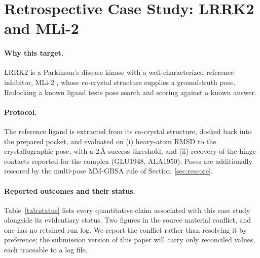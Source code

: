 \documentclass[10pt,twocolumn]{article}
\begin{document}
\section{Retrospective Case Study: LRRK2 and MLi-2}
\label{sec:case}

\paragraph{Why this target.} LRRK2 is a Parkinson's disease kinase with a
well-characterized reference inhibitor, MLi-2 \citep{fell2015mli2}, whose
co-crystal structure supplies a ground-truth pose. Redocking a known ligand
tests pose search and scoring against a known answer.

\paragraph{Protocol.} The reference ligand is extracted from its co-crystal
structure, docked back into the prepared pocket, and evaluated on (i) heavy-atom
RMSD to the crystallographic pose, with a 2\,\AA{} success threshold, and (ii)
recovery of the hinge contacts reported for the complex (GLU1948, ALA1950).
Poses are additionally rescored by the multi-pose MM-GBSA rule of
Section~\ref{sec:rescore}.

\paragraph{Reported outcomes and their status.} Table~\ref{tab:status} lists
every quantitative claim associated with this case study alongside its
evidentiary status. Two figures in the source material conflict, and one has no
retained run log. We report the conflict rather than resolving it by
preference; the submission version of this paper will carry only reconciled
values, each traceable to a log file.
\end{document}
